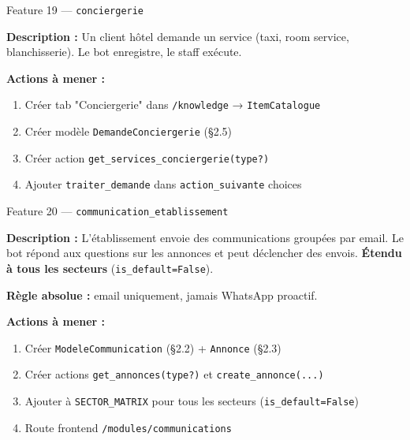 \documentclass[11pt,a4paper]{article}
\newcommand{\slug}[1]{\texttt{\color{AGTDark}#1}}
\begin{document}
\bigskip

\begin{featurebox}{Feature 19 — \slug{conciergerie}}

\textbf{Description :} Un client hôtel demande un service (taxi, room service,
blanchisserie). Le bot enregistre, le staff exécute.

\textbf{Actions à mener :}
\begin{enumerate}
  \item Créer tab "Conciergerie" dans \texttt{/knowledge} → \slug{ItemCatalogue}
  \item Créer modèle \slug{DemandeConciergerie} (§2.5)
  \item Créer action \slug{get\_services\_conciergerie(type?)}
  \item Ajouter \texttt{traiter\_demande} dans \slug{action\_suivante} choices
\end{enumerate}

\end{featurebox}

\bigskip

\begin{featurebox}{Feature 20 — \slug{communication\_etablissement}}

\textbf{Description :} L'établissement envoie des communications groupées par email.
Le bot répond aux questions sur les annonces et peut déclencher des envois.
\textbf{Étendu à tous les secteurs} (\texttt{is\_default=False}).

\textbf{Règle absolue :} email uniquement, jamais WhatsApp proactif.

\textbf{Actions à mener :}
\begin{enumerate}
  \item Créer \slug{ModeleCommunication} (§2.2) + \slug{Annonce} (§2.3)
  \item Créer actions \slug{get\_annonces(type?)} et \slug{create\_annonce(...)}
  \item Ajouter à \slug{SECTOR\_MATRIX} pour tous les secteurs (\texttt{is\_default=False})
  \item Route frontend \texttt{/modules/communications}
\end{enumerate}

\end{featurebox}

\bigskip
\end{document}

